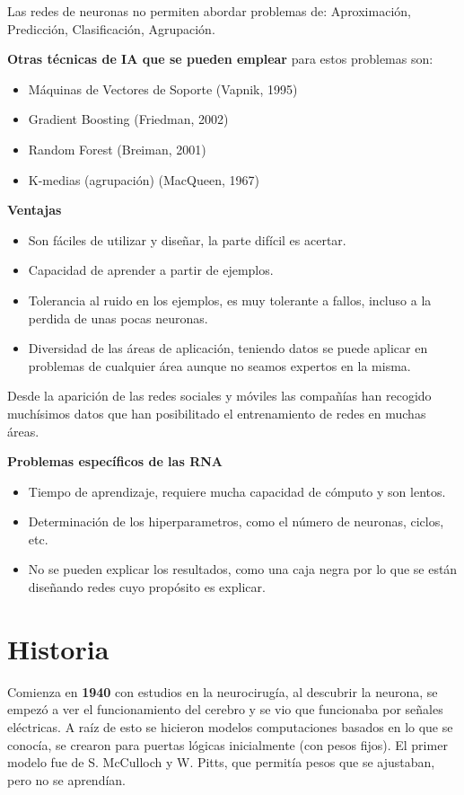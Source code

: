 \documentclass[12pt, twoside, openright]{report} %
\begin{document}
Las redes de neuronas no permiten abordar problemas de: Aproximación, Predicción, Clasificación, Agrupación.

\textbf{Otras técnicas de IA que se pueden emplear} para estos problemas son:
\begin{itemize}
	\item Máquinas de Vectores de Soporte (Vapnik, 1995)
	\item Gradient Boosting (Friedman, 2002)
	\item Random Forest (Breiman, 2001)
	\item K-medias (agrupación) (MacQueen, 1967)
\end{itemize}

\textbf{Ventajas}
\begin{itemize}
	\item Son fáciles de utilizar y diseñar, la parte difícil es acertar.
	\item Capacidad de aprender a partir de ejemplos.
	\item Tolerancia al ruido en los ejemplos, es muy tolerante a fallos, incluso a la perdida de unas pocas neuronas.
	\item Diversidad de las áreas de aplicación, teniendo datos se puede aplicar en problemas de cualquier área aunque no seamos expertos en la misma.
\end{itemize}

Desde la aparición de las redes sociales y móviles las compañías han recogido muchísimos datos que han posibilitado el entrenamiento de redes en muchas áreas.

\textbf{Problemas específicos de las RNA}
\begin{itemize}
	\item Tiempo de aprendizaje, requiere mucha capacidad de cómputo y son lentos.
	\item Determinación de los hiperparametros, como el número de neuronas, ciclos, etc.
	\item No se pueden explicar los resultados, como una caja negra por lo que se están diseñando redes cuyo propósito es explicar.
\end{itemize}

\section{Historia}
Comienza en \textbf{1940} con estudios en la neurocirugía, al descubrir la neurona, se empezó a ver el funcionamiento del cerebro y se vio que funcionaba por señales eléctricas. A raíz de esto se hicieron modelos computaciones basados en lo que se conocía, se crearon para puertas lógicas inicialmente (con pesos fijos). El primer modelo fue de S. McCulloch y W. Pitts, que permitía pesos que se ajustaban, pero no se aprendían.
\end{document}
